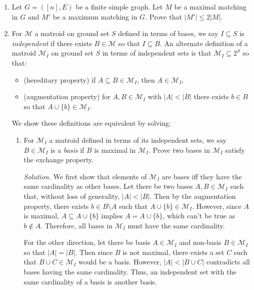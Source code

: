 \documentclass[11pt,letterpaper]{article}
\newenvironment{solution}{\color{blue}\textit{Solution.}}{\color{black}}
\begin{document}
\begin{enumerate}
\begin{solution}
        For any graph with $n>5$, any induced subgraph of $5$ vertices must follow the same property. Thus for all $n\geq{5}$, the property holds.


    \end{solution}
    
    \item Let $G = ([n],E)$ be a finite simple graph.
    Let $M$ be a maximal matching in $G$ and $M'$ be a maximum matching in $G$.
    Prove that $|M'| \leq 2 |M|$.
    
    
    \item For $\mathcal{M}$ a matroid on ground set $S$ defined in terms of bases, we say $I \subseteq S$ is \emph{independent} if there exists $B \in \mathcal{M}$ so that $I \subseteq B$.
    An alternate definition of a matroid $\mathcal{M}_I$ on ground set $S$ in terms of independent sets is that $\mathcal{M}_I \subseteq 2^{S}$ so that:
    \begin{itemize}
        \item (hereditary property) if $A \subseteq B \in \mathcal{M}_I$, then $A \in \mathcal{M}_I$,
        \item (augmentation property) for $A, B \in \mathcal{M}_I$ with $|A| < |B|$ there exists $b \in B$ so that $A \cup \{b\} \in \mathcal{M}_I$.
    \end{itemize}
    We show these definitions are equivalent by solving:
    \begin{enumerate}	
        \item For $\mathcal{M}_I$ a matroid defined in terms of its independent sets, we say $B \in \mathcal{M}_I$ is a \emph{basis} if $B$ is maximal in $\mathcal{M}_I$.
        Prove two bases in $\mathcal{M}_I$ satisfy the exchange property.

        \begin{solution}
            We first show that elements of $\mathcal{M}_I$ are bases iff they have the same cardinality as other bases. Let there be two bases $A,B\in\mathcal{M}_I$ such that, without loss of generality, $|A|<|B|$. Then by the augmentation property, there exists $b \in B\setminus{A}$ such that $A \cup \{b\} \in \mathcal{M}_I$. However, since $A$ is maximal, $A\subseteq{A\cup\{b\}}$ implies $A=A\cup\{b\}$, which can't be true as $b\notin{A}$. Therefore, all bases in $\mathcal{M}_I$ must have the same cardinality. 
            
            For the other direction, let there be basis $A\in\mathcal{M}_I$ and non-basis $B\in\mathcal{M}_I$ so that $|A|=|B|$. Then since $B$ is not maximal, there exists a set $C$ such that $B\cup{C}\in\mathcal{M}_I$ would be a basis. However, $|A|<|B\cup{C}|$ contradicts all bases having the same cardinality. Thus, an independent set with the same cardinality of a basis is another basis.


\end{solution}
\end{enumerate}
\end{enumerate}
\end{document}
